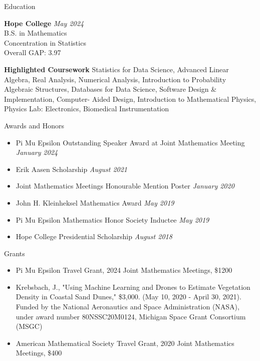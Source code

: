 \documentclass[
	11pt, %
]{resume} %
\begin{document}

\begin{rSection}{Education}
	
	\textbf{Hope College} \hfill \textit{May 2024} \\ 
	B.S. in Mathematics \\
	Concentration in Statistics \smallskip \\
	Overall GAP: 3.97

  \textbf{Highlighted Coursework}
  Statistics for Data Science, Advanced Linear Algebra, Real Analysis, Numerical Analysis, Introduction to Probability Algebraic Structures, Databases for Data Science, Software Design \& Implementation, Computer- Aided Design, Introduction to Mathematical Physics, Physics Lab: Electronics, Biomedical Instrumentation
	
\end{rSection}


\begin{rSection}{Awards and Honors}
  \begin{itemize}
    \item Pi Mu Epsilon Outstanding Speaker Award at Joint Mathematics Meeting \hfill \textit{January 2024}
    \item Erik Aasen Scholarship \hfill \textit{August 2021}

    \item Joint Mathematics Meetings Honourable Mention Poster \hfill \textit{January 2020}
    \item John H. Kleinheksel Mathematics Award \hfill \textit{May 2019} 
\item Pi Mu Epsilon Mathematics Honor Society Inductee \hfill \textit{May 2019} 
\item Hope College Presidential Scholarship \hfill \textit{August 2018} 

  \end{itemize}
    
\end{rSection}

\begin{rSection}{Grants}

  \begin{itemize}
    \item Pi Mu Epsilon Travel Grant, 2024 Joint Mathematics Meetings, \$1200

  \item Krebsbach, J., "Using Machine Learning and Drones to Estimate Vegetation Density in Coastal Sand Dunes," \$3,000. (May 10, 2020 - April 30, 2021). Funded by the National Aeronautics and Space Administration (NASA), under award number 80NSSC20M0124, Michigan Space Grant Consortium (MSGC)

  \item American Mathematical Society Travel Grant, 2020 Joint Mathematics Meetings, \$400
  \end{itemize}
\end{rSection}
\end{document}
